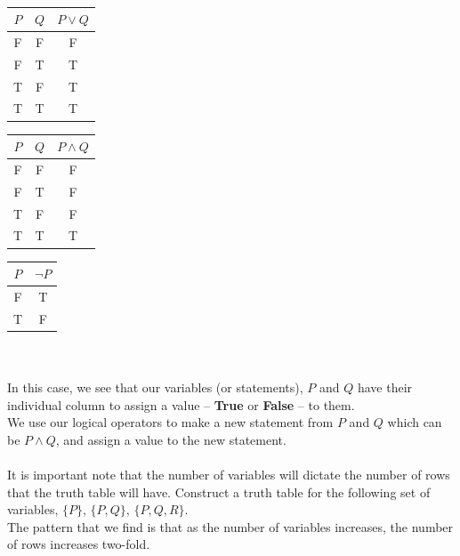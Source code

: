 \documentclass[../setup.tex]{subfiles}
\begin{document}
{
\centering
\ \ \ \ \ \ \ \ \ \ \ \ \ \ \ \ \ \ \ \ \ \ \
\begin{minipage}[t]{0.32\textwidth}
	\begin{tabular}[t]{|c|c|c|}
		\hline
		$P$&$Q$&$P\lor Q$ \\
		\hline
		F&F&F \\
		F&T&T \\
		T&F&T \\
		T&T&T \\
		\hline
	\end{tabular}
\end{minipage}
\quad
\begin{minipage}[t]{0.32\textwidth}
	\begin{tabular}[t]{|c|c|c|}
		\hline
		$P$&$Q$&$P\land Q$ \\
		\hline
		F&F&F \\
		F&T&F \\
		T&F&F \\
		T&T&T \\
		\hline
	\end{tabular} 
\end{minipage}
\quad
\begin{minipage}[t]{0.32\textwidth}
	\begin{tabular}[t]{|c|c|}
		\hline
		$P$&$\lnot P$ \\
		\hline
		F&T \\
		T&F \\
		\hline
	\end{tabular}
\end{minipage}
}
\\ 
\\
In this case, we see that our variables (or statements), $P$ and $Q$ have their individual column to assign a value -- \textbf{True} or \textbf{False} -- to them. \\
We use our logical operators to make a new statement from $P$ and $Q$ which can be $P\land Q$, and assign a value to the new statement. \\
\\
It is important note that the number of variables will dictate the number of rows that the truth table will have. Construct a truth table for the following set of variables, $\{P\}$, $\{P, Q\}$, $\{P, Q, R\}$. \\
The pattern that we find is that as the number of variables increases, the number of rows increases two-fold. \\
\end{document}
